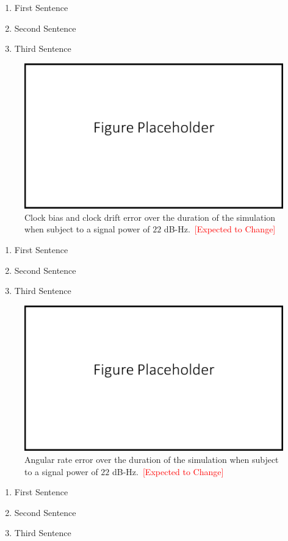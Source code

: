 \begin{enumerate}
    \item First Sentence
    \item Second Sentence
    \item Third Sentence
\end{enumerate}

\begin{figure}[!ht]
    \centering
    \includegraphics[width=0.5\linewidth]{Figures/FigurePlaceholder.png}
    \caption{Clock bias and clock drift error over the duration of the simulation when subject to a signal power of \(22\) dB-Hz.~\textcolor{red}{[Expected to Change]}}\label{fig:clockerror222}
\end{figure}

\begin{enumerate}
    \item First Sentence
    \item Second Sentence
    \item Third Sentence
\end{enumerate}

\begin{figure}[!ht]
    \centering
    \includegraphics[width=0.5\linewidth]{Figures/FigurePlaceholder.png}
    \caption{Angular rate error over the duration of the simulation when subject to a signal power of \(22\) dB-Hz.~\textcolor{red}{[Expected to Change]}}\label{fig:Angerror222}
\end{figure}

\begin{enumerate}
    \item First Sentence
    \item Second Sentence
    \item Third Sentence
\end{enumerate}

